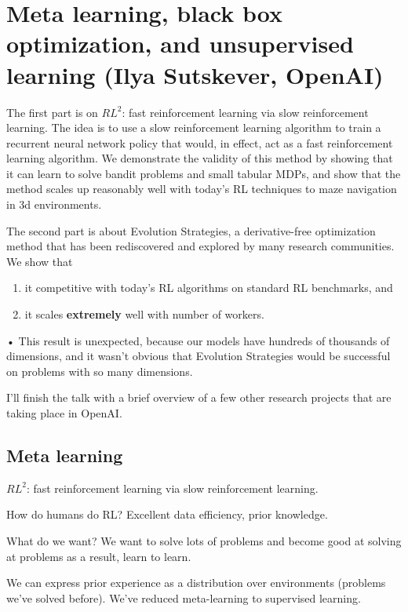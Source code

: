 \section{Meta learning, black box optimization, and unsupervised learning (Ilya Sutskever, OpenAI)}

The first part is on $RL^2$:  fast reinforcement learning via slow
reinforcement learning.  The idea is to use a slow reinforcement
learning algorithm to train a recurrent neural network policy that
would, in effect, act as a fast reinforcement learning algorithm.  We
demonstrate the validity of this method by showing that it can learn to
solve bandit problems and small tabular MDPs, and show that the method
scales up reasonably well with today's RL techniques to maze navigation
in 3d environments.

The second part is about Evolution Strategies, a derivative-free
optimization method that has been rediscovered and explored by many
research communities. We show that 
\begin{enumerate}
\item
it competitive with today's RL
algorithms on standard RL benchmarks, and 
\item it scales \textbf{extremely} well
with number of workers.
\end{enumerate}•	   This result is unexpected, because our models
have hundreds of thousands of dimensions, and it wasn't obvious that
Evolution Strategies would be successful on problems with so many
dimensions.

I'll finish the talk with a brief overview of a few other research
projects that are taking place in OpenAI.

\subsection{Meta learning}

$RL^2$:  fast reinforcement learning via slow
reinforcement learning.

How do humans do RL? Excellent data efficiency, prior knowledge.

What do we want? We want to solve lots of problems and become good at solving at problems as a result, learn to learn.

We can express prior experience as a distribution over environments (problems we've solved before). We've reduced meta-learning to supervised learning.

